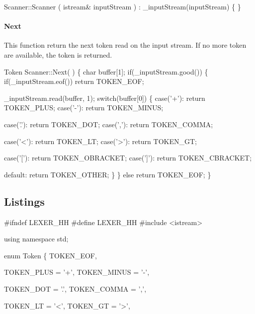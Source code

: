 \nwenddocs{}\endmoddef\nwstartdeflinemarkup\nwenddeflinemarkup
Scanner::Scanner ( istream& inputStream ) 
: _inputStream(inputStream)
\{ \}
\nwendcode{}\nwdocspar

\paragraph{Next}
This function return the next token read on the input stream. If no more token are available, the token  is returned.

\nwenddocs{}\endmoddef\nwstartdeflinemarkup\nwenddeflinemarkup
Token Scanner::Next( ) \{
        char buffer[1];
        if(_inputStream.good()) \{
                if(_inputStream.eof()) return TOKEN_EOF;

                _inputStream.read(buffer, 1);
                switch(buffer[0]) \{
                        case('+'): return TOKEN_PLUS;
                        case('-'): return TOKEN_MINUS;
                                   
                        case('.'): return TOKEN_DOT;
                        case(','): return TOKEN_COMMA;

                        case('<'): return TOKEN_LT;
                        case('>'): return TOKEN_GT;

                        case('['): return TOKEN_OBRACKET;
                        case(']'): return TOKEN_CBRACKET;

                        default: return TOKEN_OTHER;
                \}
        \} else return TOKEN_EOF;
\}
\nwendcode{}\nwdocspar

\subsection{Listings}
\nwenddocs{}\endmoddef\nwstartdeflinemarkup\nwenddeflinemarkup
#ifndef LEXER_HH
#define LEXER_HH
#include <istream>

using namespace std;

enum Token \{
        TOKEN_EOF,

        TOKEN_PLUS      = '+',
        TOKEN_MINUS     = '-',

        TOKEN_DOT       = '.',
        TOKEN_COMMA     = ',',

        TOKEN_LT        = '<',
        TOKEN_GT        = '>',

